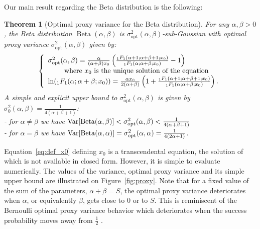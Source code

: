 \documentclass[15pt]{article}
\DeclareMathOperator{\Beta}{Beta}
\def\Rcode{The \textsf{R} code for the plots presented in this note and for a function deriving the optimal proxy variance in terms of $\alpha$ and $\beta$ is available at \href{http://www.julyanarbel.com/software}{\textsf{http://www.julyanarbel.com/software}}.}
\theoremstyle{plain}
\newtheorem{thm}{{Theorem}}%
\begin{document}
Our main result regarding the Beta distribution is the following:
%
\begin{thm}[Optimal proxy variance for the Beta distribution]\label{thm:1}
For any $\alpha,\beta>0$, the Beta distribution $\Beta(\alpha,\beta)$ is $\sigma_{\text{opt}}^2(\alpha,\beta)$-sub-Gaussian with optimal proxy variance $\sigma_{\text{opt}}^2(\alpha,\beta)$ given by:
\begin{equation}\label{eq:def_x0}
\left\{\begin{array}{ll}
        \sigma_{\text{opt}}^2(\alpha,\beta)=\frac{\alpha}{(\alpha+\beta)x_0}\left( \frac{_1F_1(\alpha+1;\alpha+\beta+1;x_0)}{_1F_1(\alpha;\alpha+\beta;x_0)}  -1\right)\cr
\quad\quad \text{ where }x_0 \text{ is the unique solution of the equation}\cr
		\ln(_1F_1(\alpha;\alpha+\beta;x_0))=\frac{\alpha x_0}{2(\alpha+\beta)}\left(1+\frac{_1F_1(\alpha+1;\alpha+\beta+1;x_0)}{_1F_1(\alpha;\alpha+\beta;x_0)}\right).
    \end{array}
\right.  
\end{equation}
%
A simple and explicit upper bound to $\sigma_{\text{opt}}^2(\alpha,\beta)$
is given by $\sigma_0^2(\alpha,\beta) = \frac{1}{4(\alpha+\beta+1)}$:\\
- for $\alpha\neq \beta$ we have $\text{\normalfont{Var}}[\Beta(\alpha,\beta)]<\sigma_{\text{opt}}^2(\alpha,\beta)<\frac{1}{4(\alpha+\beta+1)}$\\
- for $\alpha=\beta$ we have $\text{\normalfont{Var}}[\Beta(\alpha,\alpha)] = \sigma_{\text{opt}}^2(\alpha,\alpha)=\frac{1}{4(2\alpha+1)}$. 
\end{thm}
%
Equation~\eqref{eq:def_x0} defining $x_0$  is a transcendental equation, the solution of which is not available in closed form. However, it is simple to evaluate numerically. %
The values of the variance, optimal proxy variance and its simple upper bound are illustrated on Figure~\ref{fig:proxy}. Note that for a fixed value of the sum of the parameters, $\alpha+\beta = S$, the optimal proxy variance deteriorates when $\alpha$, or equivalently $\beta$,  gets close to 0 or to $S$. This is reminiscent of the Bernoulli optimal proxy variance behavior which deteriorates when the success probability moves away from $\frac{1}{2}$ \citep{buldygin2000binary}.
\end{document}
